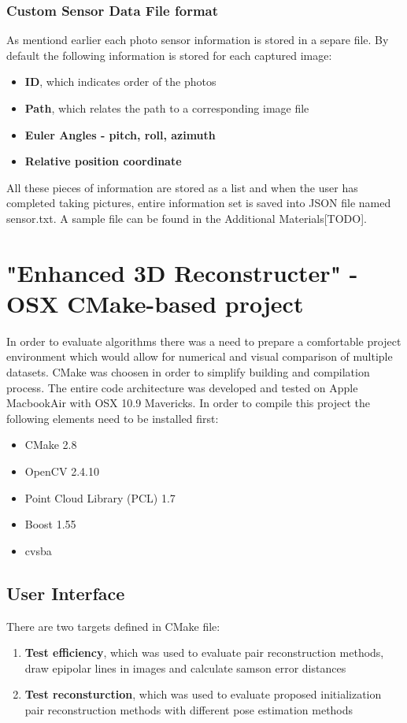 \subsubsection{Custom Sensor Data File format}
As mentiond earlier each photo sensor information is stored in a separe file. By default the following information is stored for each captured image:
\begin{itemize}
\item \textbf{ID}, which indicates order of the photos
\item \textbf{Path}, which relates the path to a corresponding image file
\item \textbf{Euler Angles - pitch, roll, azimuth}
\item \textbf{Relative position coordinate}
\end{itemize} 
All these pieces of information are stored as a list and when the user has completed taking pictures, entire information set is saved into JSON file named sensor.txt. A sample file can be found in the Additional Materials[TODO].\pagebreak

\section{"Enhanced 3D Reconstructer" - OSX CMake-based project}
In order to evaluate algorithms there was a need to prepare a comfortable project environment which would allow for numerical and visual comparison of multiple datasets. CMake was choosen in order to simplify building and compilation process. The entire code architecture was developed and tested on Apple MacbookAir with OSX 10.9 Mavericks. In order to compile this project the following elements need to be installed first:
\begin{itemize}
\item CMake 2.8
\item OpenCV 2.4.10
\item Point Cloud Library (PCL) 1.7 \cite{website:pcl}
\item Boost 1.55
\item cvsba \cite{website:cvsba}
\end{itemize}
\subsection{User Interface}
There are two targets defined in CMake file:
\begin{enumerate}
\item \textbf{Test efficiency}, which was used to evaluate pair reconstruction methods, draw epipolar lines in images and calculate samson error distances
\item \textbf{Test reconsturction}, which was used to evaluate proposed initialization pair reconstruction methods with different pose estimation methods
\end{enumerate}
